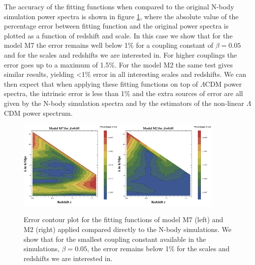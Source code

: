 The accuracy of the fitting functions when compared to the original
N-body simulation power spectra is shown in figure \ref{fig:Error-contour-plot},
where the absolute value of the percentage error between fitting function
and the original power spectra is plotted as a function of redshift
and scale. In this case we show that for the model M7 the error remains
well below 1\% for a coupling constant of $\beta=0.05$ and for the
scales and redshifts we are interested in. For higher couplings the
error goes up to a maximum of 1.5\%. For the model M2 the same test
gives similar results, yielding <1\% error in all interesting scales
and redshifts. We can then expect that when applying these fitting
functions on top of $\Lambda$CDM power spectra, the intrinsic error
is less than 1\% and the extra sources of error are all given by the
N-body simulation spectra and by the estimators of the non-linear
$\Lambda$CDM power spectrum.

\begin{figure}
\centering{}\includegraphics[width=0.45\textwidth]{Chapters/fitting-funcs/figures/FinalContourM7beta5}\includegraphics[width=0.45\textwidth]{Chapters/fitting-funcs/figures/FinalContourM2beta5}
\caption[Error contour plot for two distinct fitting models in CDE.]{\label{fig:Error-contour-plot}Error contour plot for the fitting
functions of model M7 (left) and M2 (right) applied compared directly
to the N-body simulations. We show that for the smallest coupling
constant available in the simulations, $\beta=0.05$, the error remains
below 1\% for the scales and redshifts we are interested in.}
\end{figure}


